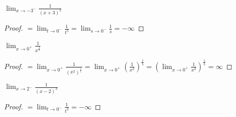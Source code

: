 \documentclass[a4paper,12pt]{scrartcl}
\begin{document}
\begin{example}
	$\lim_{x \to -3^-} \frac{1}{(x+3)^5}$
\end{example}
\begin{proof}
	$= \lim_{t \to 0^-} \frac{1}{t^5} = \lim_{s \to 0^-} \frac{1}{s} = -\infty$
\end{proof}
\begin{example}
	$\lim_{x \to 0^+}\frac{1}{x^{\frac{2}{5}}}$
\end{example}
\begin{proof}
	$=\lim_{x \to 0^+} \frac{1}{(x^2)^{\frac{1}{5}}}=\lim_{x \to 0^+} (\frac{1}{x^2})^{\frac{1}{5}} = (\lim_{x \to 0^+} \frac{1}{x^2})^{\frac{1}{5}}=\infty$
\end{proof}
\begin{example}
	$\lim_{x \to 2^-} \frac{1}{(x-2)^3}$
\end{example}
\begin{proof}
	$=\lim_{t\to 0^-} \frac{1}{t^3}=-\infty$
\end{proof}
\end{document}
